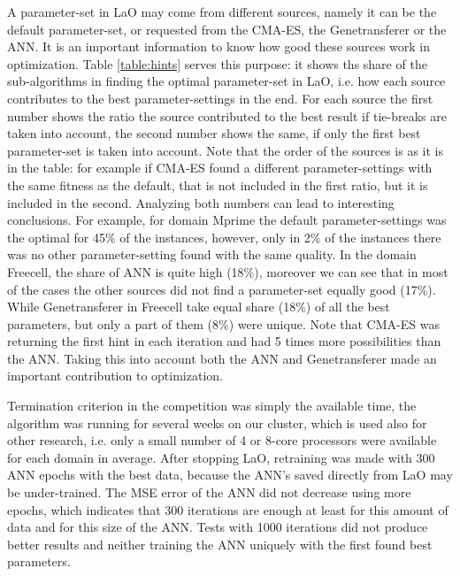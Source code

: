 \documentclass[letterpaper]{article}
\begin{document}
A parameter-set in LaO may come from different sources, namely it can be the default parameter-set, or requested from the CMA-ES, the Genetransferer or the ANN. It is an important information to know how good these sources work in optimization. Table \ref{table:hints} serves this purpose: it shows ths share of the sub-algorithms in finding the optimal parameter-set in LaO, i.e. how each source contributes to the best parameter-settings in the end. For each source the first number shows the ratio the source contributed to the best result if tie-breaks are taken into account, the second number shows the same, if only the first best parameter-set is taken into account. Note that the order of the sources is as it is in the table: for example if CMA-ES found a different parameter-settings with the same fitness as the default, that is not included in the first ratio, but it is included in the second. Analyzing both numbers can lead to interesting conclusions. For example, for domain Mprime the default parameter-settings was the optimal for 45\% of the instances, however, only in 2\% of the instances there was no other parameter-setting found with the same quality. In the domain Freecell, the share of ANN is quite high (18\%), moreover we can see that in most of the cases the other sources did not find a parameter-set equally good (17\%). While Genetransferer in Freecell take equal share (18\%) of all the best parameters, but only a part of them (8\%) were unique. Note that CMA-ES was returning the first hint in each iteration and had 5 times more possibilities than the ANN. Taking this into account both the ANN and Genetransferer made an important contribution to optimization.

Termination criterion in the competition was simply the available time, the algorithm was running for several weeks on our cluster, which is used also for other research, i.e. only a small number of 4 or 8-core processors were available for each domain in average. After stopping LaO, retraining was made with 300 ANN epochs with the best data, because the ANN's saved directly from LaO may be under-trained. The MSE error of the ANN did not decrease using more epochs, which indicates that 300 iterations are enough at least for this amount of data and for this size of the ANN. Tests with 1000 iterations did not produce better results and neither training the ANN uniquely with the first found best parameters.
\end{document}
